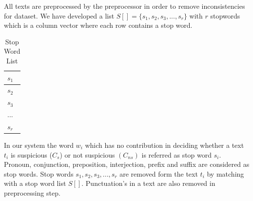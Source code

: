 All texts are preprocessed by the preprocessor in order to remove inconsistencies for dataset. We have developed a list $S[]=\{s_1, s_2, s_3, ..., s_r\}$ with $r$ stopwords which is a column vector where each row contains a stop word.\par
\begin{table}[h!]
\begin{center}
\caption{Stop Word List}
\begin{tabular}{|m{0.7cm}|}
\hline
     $s_1$ \\
\hline
    $s_2$ \\
\hline 
    $s_3$ \\
\hline
 $...$ \\
 \hline
 $s_r$ \\
 \hline
\end{tabular}
\end{center}
\end{table}
\vspace{0.1cm}
In our system the word $w_i$ which has no contribution in deciding whether a text $t_i$ is suspicious ($C_s$) or not suspicious $(C_{ns})$ is referred as stop word $s_i$. Pronoun, conjunction, preposition, interjection, prefix and suffix are considered as stop words. Stop words $ s_1, s_2, s_3, ..., s_r$ are removed form the text $t_i$ by matching with a stop word list $S[]$. Punctuation's in a text are also removed in preprocessing step.


